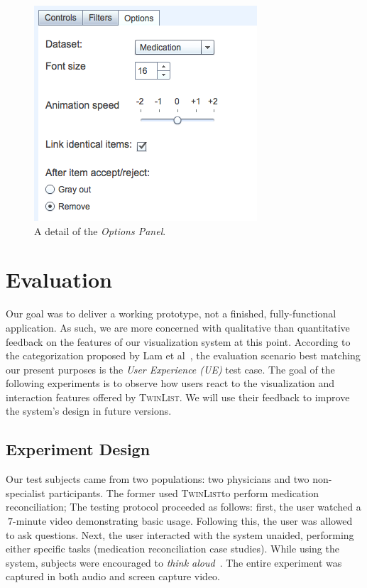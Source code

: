 \documentclass{chi2009}
\newcommand{\TwinList}{\textsc{TwinList}}
\newcommand{\Options}{\textit{Options Panel}}
\begin{document}
\begin{figure}[t]
\begin{center}
\includegraphics[width=1\linewidth]{img/options.png}
\end{center}
   \caption{A detail of the \Options.}
   \label{fig:options}
\end{figure}

\section{Evaluation}
Our goal was to deliver a working prototype, not a finished, fully-functional application. As such, we are more concerned with qualitative than quantitative feedback on the features of our visualization system at this point. According to the categorization proposed by Lam et al~\cite{lam-bertini-isenberg-plaisant-carpendale-2011}, the evaluation scenario best matching our present purposes is the \textit{User Experience (UE)} test case. The goal of the following experiments is to observe how users react to the visualization and interaction features offered by \TwinList. We will use their feedback to improve the system's design in future versions.

\subsection{Experiment Design}
Our test subjects came from two populations: two physicians and two non-specialist participants. The former used \TwinList to perform medication reconciliation; The testing protocol proceeded as follows: first, the user watched a $~7$-minute video demonstrating basic usage. Following this, the user was allowed to ask questions. Next, the user interacted with the system unaided, performing either specific tasks (medication reconciliation case studies). While using the system, subjects were encouraged to \textit{think aloud}~\cite{lewis-1982}. The entire experiment was captured in both audio and screen capture video. 
\end{document}
